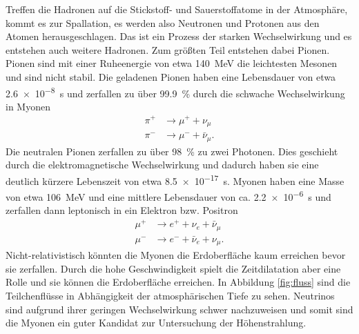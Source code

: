 Treffen die Hadronen auf die Stickstoff- und Sauerstoffatome in der Atmosphäre, kommt es zur Spallation, es werden also Neutronen und Protonen aus den Atomen herausgeschlagen. Das ist ein Prozess der starken Wechselwirkung und es entstehen auch weitere Hadronen. Zum größten Teil entstehen dabei Pionen. Pionen sind mit einer Ruheenergie von etwa \SI{140}{\mega \electronvolt} die leichtesten Mesonen und sind nicht stabil. Die geladenen Pionen haben eine Lebensdauer von etwa \SI{2.6e-8}{\second} und zerfallen zu über \SI{99.9}{\percent} durch die schwache Wechselwirkung in Myonen
\begin{align*}
  \pi^+ &\rightarrow \mu^+ + \nu_\mu\\
  \pi^- &\rightarrow \mu^- + \bar{\nu}_\mu.
\end{align*}
Die neutralen Pionen zerfallen zu über \SI{98}{\percent} zu zwei Photonen. Dies geschieht durch die elektromagnetische Wechselwirkung und dadurch haben sie eine deutlich kürzere Lebenszeit von etwa \SI{8.5e-17}{\second}.
Myonen haben eine Masse von etwa \SI{106}{\mega\electronvolt} und eine mittlere Lebensdauer von ca. \SI{2.2e-6}{\second} und zerfallen dann leptonisch in ein Elektron bzw. Positron
\begin{align*}
  \mu^+ &\rightarrow e^++ \nu_e +\bar{\nu}_\mu\\
  \mu^- &\rightarrow e^-+ \bar{\nu}_e +\nu_\mu.
\end{align*}
Nicht-relativistisch könnten die Myonen die Erdoberfläche kaum erreichen bevor sie zerfallen. Durch die hohe Geschwindigkeit spielt die Zeitdilatation aber eine Rolle und sie können die Erdoberfläche erreichen. In Abbildung \ref{fig:fluss} sind die Teilchenflüsse in Abhängigkeit der atmosphärischen Tiefe zu sehen. Neutrinos sind aufgrund ihrer geringen Wechselwirkung schwer nachzuweisen und somit sind die Myonen ein guter Kandidat zur Untersuchung der Höhenstrahlung.   

